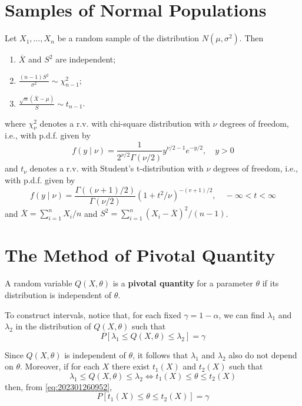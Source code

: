 \documentclass[12pt,a4paper]{report}
\begin{document}
\section{Samples of Normal Populations}

\begin{theorem}\label{thm:sample_normal}
    Let $X_1, \ldots, X_n$ be a random sample of the distribution $N(\mu, \sigma^2)$. Then 
    \begin{enumerate}
        \item $\overline{X}$ and $S^2$ are independent; 
        \item $\frac{(n-1)S^2}{\sigma^2} \sim \chi_{n-1}^2$;
        \item $\frac{\sqrt{n}(\overline{X} - \mu)}{S} \sim t_{n-1}$.
    \end{enumerate}
    where $\chi_\nu^2$ denotes a r.v. with chi-square distribution with $\nu$ degrees of freedom, i.e., with p.d.f. given by 
    \[
        f(y \mid \nu) = \frac{1}{2^{\nu / 2} \Gamma(\nu/2)} y^{\nu/2 - 1} e^{-y/2}, \quad y > 0
    \]
    and $t_\nu$ denotes a r.v. with Student's t-distribution with $\nu$ degrees of freedom, i.e., with p.d.f. given by 
    \[
        f(y \mid \nu) = \frac{\Gamma ((\nu + 1) / 2)}{\Gamma (\nu / 2)} (1 + t^2/\nu)^{-(v+1)/2}, \quad -\infty < t < \infty
    \]
    and $\overline{X} = \sum_{i=1}^{n} X_i/n$ and $S^2 = \sum_{i=1}^{n} (X_i - \overline{X})^2/(n-1)$.
\end{theorem}

\section{The Method of Pivotal Quantity}

\begin{definition}
    A random variable $Q(X, \theta)$ is a \textbf{pivotal quantity} for a parameter $\theta$ if its distribution is independent of $\theta$.
\end{definition}

To construct intervals, notice that, for each fixed $\gamma = 1 - \alpha$, we can find $\lambda_1$ and $\lambda_2$ in the distribution of $Q(X, \theta)$ such that 
\begin{equation}\label{eq:202301260952}
    P[\lambda_1 \leq Q(X, \theta) \leq \lambda_2] = \gamma 
\end{equation}

Since $Q(X, \theta)$ is independent of $\theta$, it follows that $\lambda_1$ and $\lambda_2$ also do not depend on $\theta$. Moreover, if for each $X$ there exist $t_1(X)$ and $t_2(X)$ such that 
\[
    \lambda_1 \leq Q(X, \theta) \leq \lambda_2 \iff t_1(X) \leq \theta \leq t_2(X)
\]
then, from \eqref{eq:202301260952},
\begin{equation}\label{eq:202301260953}
    P[t_1(X) \leq \theta \leq t_2(X)] = \gamma
\end{equation}
\end{document}

